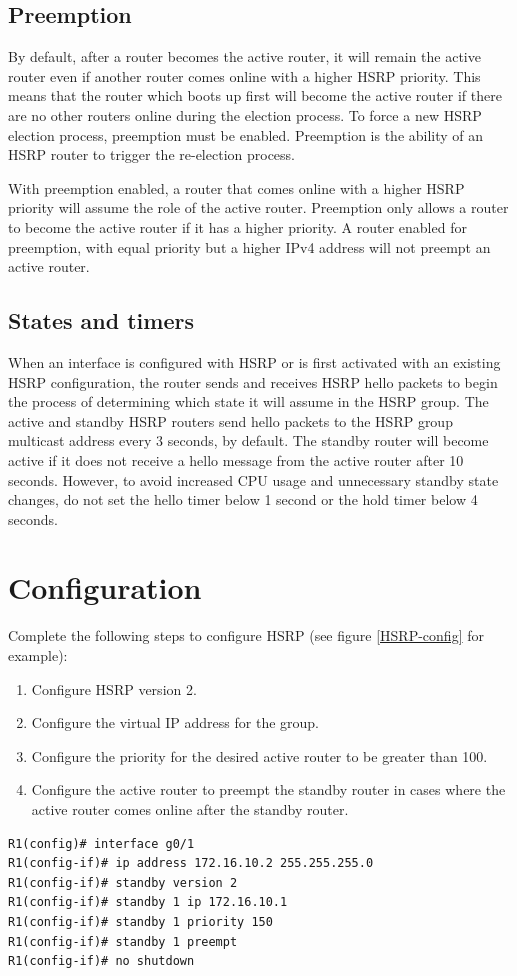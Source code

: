 \subsection{Preemption}
By default, after a router becomes the active router, it will remain the active router even if another router comes online with a higher HSRP priority. This means that the router which boots up first will become the active router if there are no other routers online during the election process. To force a new HSRP election process, preemption must be enabled. Preemption is the ability of an HSRP router to trigger the re-election process. \par 
With preemption enabled, a router that comes online with a higher HSRP priority will assume the role of the active router. Preemption only allows a router to become the active router if it has a higher priority. A router enabled for preemption, with equal priority but a higher IPv4 address will not preempt an active router.
\subsection{States and timers}
When an interface is configured with HSRP or is first activated with an existing HSRP configuration, the router sends and receives HSRP hello packets to begin the process of determining which state it will assume in the HSRP group. The active and standby HSRP routers send hello packets to the HSRP group multicast address every 3 seconds, by default. The standby router will become active if it does not receive a hello message from the active router after 10 seconds. However, to avoid increased CPU usage and unnecessary standby state changes, do not set the hello timer below 1 second or the hold timer below 4 seconds.

\section{Configuration}
Complete the following steps to configure HSRP (see figure \ref{HSRP-config} for example):
\begin{enumerate}
    \item Configure HSRP version 2.
    \item Configure the virtual IP address for the group.
    \item Configure the priority for the desired active router to be greater than 100.
    \item Configure the active router to preempt the standby router in cases where the active router comes online after the standby router.
    \end{enumerate}
\begin{verbatim}
R1(config)# interface g0/1
R1(config-if)# ip address 172.16.10.2 255.255.255.0
R1(config-if)# standby version 2
R1(config-if)# standby 1 ip 172.16.10.1
R1(config-if)# standby 1 priority 150
R1(config-if)# standby 1 preempt
R1(config-if)# no shutdown
\end{verbatim}
